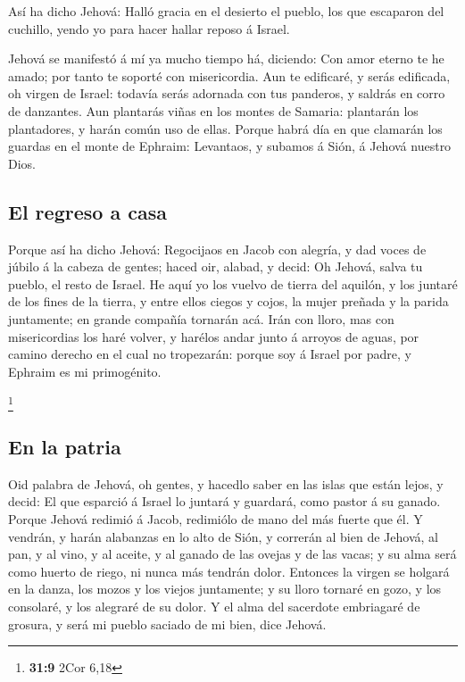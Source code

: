  Así ha dicho Jehová: Halló gracia en el desierto el pueblo,
los que escaparon del cuchillo, yendo yo para hacer hallar reposo á
Israel.

 Jehová se manifestó á mí ya mucho tiempo há, diciendo: Con
amor eterno te he amado; por tanto te soporté con misericordia.
 Aun te edificaré, y serás edificada, oh virgen de Israel:
todavía serás adornada con tus panderos, y saldrás en corro de
danzantes.  Aun plantarás viñas en los montes de Samaria:
plantarán los plantadores, y harán común uso de ellas. 
Porque habrá día en que clamarán los guardas en el monte de Ephraim:
Levantaos, y subamos á Sión, á Jehová nuestro Dios.

\hypertarget{el-regreso-a-casa}{%
\subsection{El regreso a casa}\label{el-regreso-a-casa}}

 Porque así ha dicho Jehová: Regocijaos en Jacob con
alegría, y dad voces de júbilo á la cabeza de gentes; haced oir, alabad,
y decid: Oh Jehová, salva tu pueblo, el resto de Israel.  He
aquí yo los vuelvo de tierra del aquilón, y los juntaré de los fines de
la tierra, y entre ellos ciegos y cojos, la mujer preñada y la parida
juntamente; en grande compañía tornarán acá.  Irán con
lloro, mas con misericordias los haré volver, y harélos andar junto á
arroyos de aguas, por camino derecho en el cual no tropezarán: porque
soy á Israel por padre, y Ephraim es mi primogénito.

\footnote{\textbf{31:9} 2Cor 6,18}

\hypertarget{en-la-patria}{%
\subsection{En la patria}\label{en-la-patria}}

 Oid palabra de Jehová, oh gentes, y hacedlo saber en las
islas que están lejos, y decid: El que esparció á Israel lo juntará y
guardará, como pastor á su ganado.  Porque Jehová redimió á
Jacob, redimiólo de mano del más fuerte que él.  Y vendrán,
y harán alabanzas en lo alto de Sión, y correrán al bien de Jehová, al
pan, y al vino, y al aceite, y al ganado de las ovejas y de las vacas; y
su alma será como huerto de riego, ni nunca más tendrán dolor.
 Entonces la virgen se holgará en la danza, los mozos y los
viejos juntamente; y su lloro tornaré en gozo, y los consolaré, y los
alegraré de su dolor.  Y el alma del sacerdote embriagaré
de grosura, y será mi pueblo saciado de mi bien, dice Jehová.

